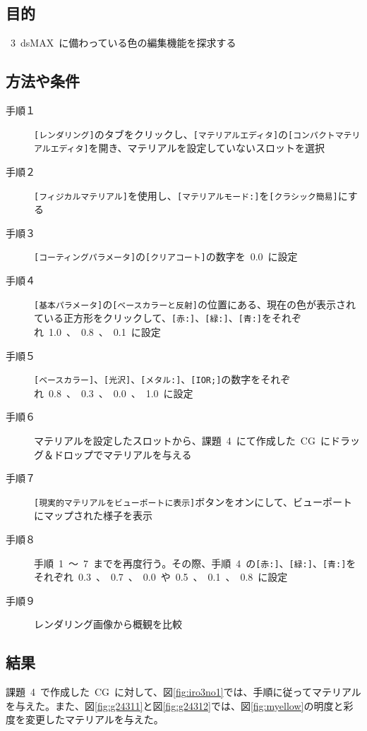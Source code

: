 \documentclass[a4j]{jarticle}
\begin{document}
\subsection{目的}
%
\ 3\ dsMAX\ に備わっている色の編集機能を探求する
%
\subsection{方法や条件}
%
\begin{description}
  \item[手順１] \verb|[レンダリング]|のタブをクリックし、\verb|[マテリアルエディタ]|の\verb|[コンパクトマテリアルエディタ]|を開き、マテリアルを設定していないスロットを選択
  \item[手順２] \verb|[フィジカルマテリアル]|を使用し、\verb|[マテリアルモード:]|を\verb|[クラシック簡易]|にする
  \item[手順３] \verb|[コーティングパラメータ]|の\verb|[クリアコート]|の数字を\ 0.0\ に設定
  \item[手順４] \verb|[基本パラメータ]|の\verb|[ベースカラーと反射]|の位置にある、現在の色が表示されている正方形をクリックして、\verb|[赤:]|、\verb|[緑:]|、\verb|[青:]|をそれぞれ\ 1.0\ 、\ 0.8\ 、\ 0.1\ に設定
  \item[手順５] \verb|[ベースカラー]|、\verb|[光沢]|、\verb|[メタル:]|、\verb|[IOR;]|の数字をそれぞれ\ 0.8\ 、\ 0.3\ 、\ 0.0\ 、\ 1.0\ に設定
  \item[手順６] マテリアルを設定したスロットから、課題\ 4\ にて作成した\ CG\ にドラッグ＆ドロップでマテリアルを与える
  \item[手順７] \verb|[現実的マテリアルをビューポートに表示]|ボタンをオンにして、ビューポートにマップされた様子を表示
  \item[手順８] 手順\ 1\ ～\ 7\ までを再度行う。その際、手順\ 4\ の\verb|[赤:]|、\verb|[緑:]|、\verb|[青:]|をそれぞれ\ 0.3\ 、\ 0.7\ 、\ 0.0\ や\ 0.5\ 、\ 0.1\ 、\ 0.8\ に設定
  \item[手順９] レンダリング画像から概観を比較
\end{description}

%
\newpage
\subsection{結果}
%
課題\ 4\ で作成した\ CG\ に対して、図\ref{fig:iro3no1}では、手順に従ってマテリアルを与えた。また、図\ref{fig:g24311}と図\ref{fig:g24312}では、図\ref{fig:myellow}の明度と彩度を変更したマテリアルを与えた。
\end{document}
